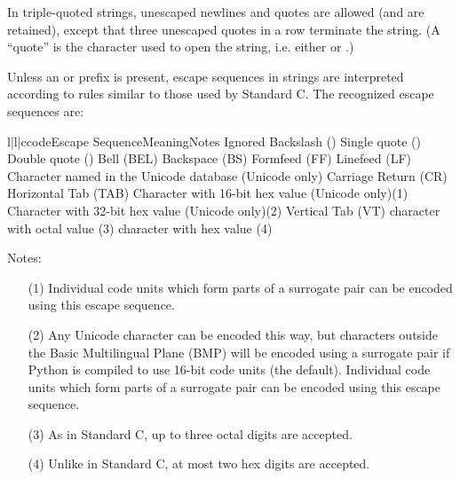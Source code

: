 In triple-quoted strings,
unescaped newlines and quotes are allowed (and are retained), except
that three unescaped quotes in a row terminate the string.  (A
``quote'' is the character used to open the string, i.e. either
 or .)

Unless an  or  prefix is present, escape
sequences in strings are interpreted according to rules similar
to those used by Standard C.  The recognized escape sequences are:

\begin{tableiii}{l|l|c}{code}{Escape Sequence}{Meaning}{Notes}
 {Ignored}{}
\lineiii{\e\e}	{Backslash (\code{\e})}{}
	{Single quote ()}{}
	{Double quote ()}{}
	{\ASCII{} Bell (BEL)}{}
	{\ASCII{} Backspace (BS)}{}
	{\ASCII{} Formfeed (FF)}{}
	{\ASCII{} Linefeed (LF)}{}
        {Character named  in the Unicode database (Unicode only)}{}
	{\ASCII{} Carriage Return (CR)}{}
	{\ASCII{} Horizontal Tab (TAB)}{}
        {Character with 16-bit hex value  (Unicode only)}{(1)}
        {Character with 32-bit hex value  (Unicode only)}{(2)}
	{\ASCII{} Vertical Tab (VT)}{}
 {\ASCII{} character with octal value }{(3)}
 {\ASCII{} character with hex value }{(4)}
\end{tableiii}

\noindent
Notes:

\begin{itemize}
\item[(1)]
  Individual code units which form parts of a surrogate pair can be
  encoded using this escape sequence.
\item[(2)]
  Any Unicode character can be encoded this way, but characters
  outside the Basic Multilingual Plane (BMP) will be encoded using a
  surrogate pair if Python is compiled to use 16-bit code units (the
  default).  Individual code units which form parts of a surrogate
  pair can be encoded using this escape sequence.
\item[(3)]
  As in Standard C, up to three octal digits are accepted.
\item[(4)]
  Unlike in Standard C, at most two hex digits are accepted.
\end{itemize}



